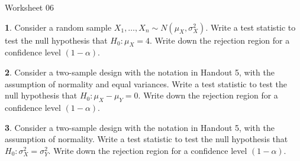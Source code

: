 \documentclass{tufte-handout}
\begin{document}
\justify

{\LARGE Worksheet 06}

\vspace*{18pt}


\textbf{1}. Consider a random sample $X_1, \ldots, X_n \sim N(\mu_X, \sigma^2_X)$. 
Write a test statistic to test the null hypothesis that $H_0: \mu_X = 4$.
Write down the rejection region for a confidence level 
$(1 - \alpha)$. 

\textbf{2}. Consider a two-sample design with the notation in Handout 5, with the assumption
of normality and equal variances. Write a test statistic to test the null
hypothesis that $H_0: \mu_X - \mu_Y = 0$. Write down the
rejection region for a confidence level  $(1 - \alpha)$.

\textbf{3}. Consider a two-sample design with the notation in Handout 5, with the assumption
of normality. Write a test statistic to test the null
hypothesis that $H_0: \sigma_X^2 = \sigma_Y^2$. Write down the
rejection region for a confidence level  $(1 - \alpha)$.
\end{document}
